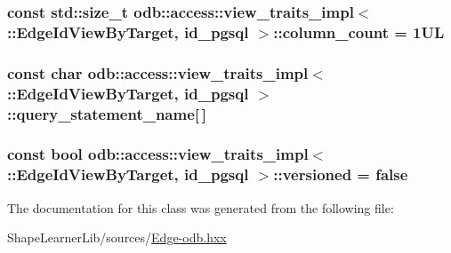 \subsubsection[{column\+\_\+count}]{\setlength{\rightskip}{0pt plus 5cm}const std\+::size\+\_\+t odb\+::access\+::view\+\_\+traits\+\_\+impl$<$ \+::{\bf Edge\+Id\+View\+By\+Target}, id\+\_\+pgsql $>$\+::column\+\_\+count = 1\+U\+L\hspace{0.3cm}{\ttfamily [static]}}\label{classodb_1_1access_1_1view__traits__impl_3_01_1_1_edge_id_view_by_target_00_01id__pgsql_01_4_ae060865ebbdddfe93f52da126f06cab8}
\hypertarget{classodb_1_1access_1_1view__traits__impl_3_01_1_1_edge_id_view_by_target_00_01id__pgsql_01_4_a7289178c7adba776c5e83ac4e2157572}{}
\subsubsection[{query\+\_\+statement\+\_\+name}]{\setlength{\rightskip}{0pt plus 5cm}const char odb\+::access\+::view\+\_\+traits\+\_\+impl$<$ \+::{\bf Edge\+Id\+View\+By\+Target}, id\+\_\+pgsql $>$\+::query\+\_\+statement\+\_\+name\mbox{[}$\,$\mbox{]}\hspace{0.3cm}{\ttfamily [static]}}\label{classodb_1_1access_1_1view__traits__impl_3_01_1_1_edge_id_view_by_target_00_01id__pgsql_01_4_a7289178c7adba776c5e83ac4e2157572}
\hypertarget{classodb_1_1access_1_1view__traits__impl_3_01_1_1_edge_id_view_by_target_00_01id__pgsql_01_4_ae3fafc6645466be4c37e23461f7520ba}{}
\subsubsection[{versioned}]{\setlength{\rightskip}{0pt plus 5cm}const bool odb\+::access\+::view\+\_\+traits\+\_\+impl$<$ \+::{\bf Edge\+Id\+View\+By\+Target}, id\+\_\+pgsql $>$\+::versioned = false\hspace{0.3cm}{\ttfamily [static]}}\label{classodb_1_1access_1_1view__traits__impl_3_01_1_1_edge_id_view_by_target_00_01id__pgsql_01_4_ae3fafc6645466be4c37e23461f7520ba}


The documentation for this class was generated from the following file\+:\begin{DoxyCompactItemize}
\item 
Shape\+Learner\+Lib/sources/\hyperlink{_edge-odb_8hxx}{Edge-\/odb.\+hxx}\end{DoxyCompactItemize}
